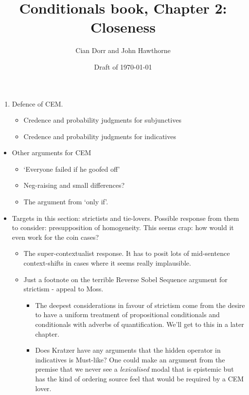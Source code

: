 \documentclass[leqno, 11pt, a5paper, openany]{article}
\begin{document}
\title{Conditionals book, Chapter 2: Closeness}
\author{Cian Dorr and John Hawthorne}
\date{Draft of \today}

\maketitle

\begin{enumerate}
\item
  Defence of CEM.

  \begin{itemize}
    \item
    Credence and probability judgments for subjunctives
  \item
    Credence and probability judgments for indicatives
  \end{itemize}
\end{enumerate}

\begin{itemize}
\item
  Other arguments for CEM

  \begin{itemize}
    \item
    ‘Everyone failed if he goofed off’
  \item
    Neg-raising and small differences?\\
  \item
    The argument from ‘only if’.
  \end{itemize}
\item
  Targets in this section: strictists and tie-lovers. Possible response
  from them to consider: presupposition of homogeneity. This seems crap:
  how would it even work for the coin cases?

  \begin{itemize}
    \item
    The super-contextualist response. It has to posit lots of
    mid-sentence context-shifts in cases where it seems really
    implausible.\\
  \item
    Just a footnote on the terrible Reverse Sobel Sequence argument for
    strictism - appeal to Moss.

    \begin{itemize}
        \item
      The deepest considerations in favour of strictism come from the
      desire to have a uniform treatment of propositional conditionals
      and conditionals with adverbs of quantification. We'll get to this
      in a later chapter.\\
    \item
      Does Kratzer have any arguments that the hidden operator in
      indicatives is Must-like? One could make an argument from the
      premise that we never see a \emph{lexicalised} modal that is
      epistemic but has the kind of ordering source feel that would be
      required by a CEM lover.\\
    \end{itemize}
  \end{itemize}
\end{itemize}
\end{document}
